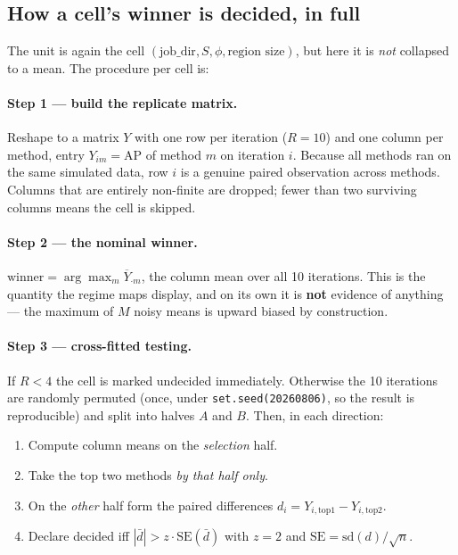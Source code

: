 \subsection{How a cell's winner is decided, in full}\label{sec:dhow}

The unit is again the cell $(\text{job\_dir},S,\phi,\text{region size})$, but
here it is \emph{not} collapsed to a mean. The procedure per cell is:

\paragraph{Step 1 --- build the replicate matrix.}
Reshape to a matrix $Y$ with one row per iteration ($R=10$) and one column per
method, entry $Y_{im}=\mathrm{AP}$ of method $m$ on iteration $i$. Because all
methods ran on the same simulated data, row $i$ is a genuine paired
observation across methods. Columns that are entirely non-finite are dropped;
fewer than two surviving columns means the cell is skipped.

\paragraph{Step 2 --- the nominal winner.}
$\text{winner}=\arg\max_m \overline{Y}_{\cdot m}$, the column mean over all 10
iterations. This is the quantity the regime maps display, and on its own it is
\textbf{not} evidence of anything --- the maximum of $M$ noisy means is upward
biased by construction.

\paragraph{Step 3 --- cross-fitted testing.}
If $R<4$ the cell is marked undecided immediately. Otherwise the 10 iterations
are randomly permuted (once, under \texttt{set.seed(20260806)}, so the result is
reproducible) and split into halves $A$ and $B$. Then, in each direction:
\begin{enumerate}
\item Compute column means on the \emph{selection} half.
\item Take the top two methods \emph{by that half only}.
\item On the \emph{other} half form the paired differences
$d_i = Y_{i,\text{top1}} - Y_{i,\text{top2}}$.
\item Declare decided iff $|\bar d| > z\cdot\mathrm{SE}(\bar d)$ with $z=2$ and
$\mathrm{SE}=\mathrm{sd}(d)/\sqrt{n}$.
\end{enumerate}

